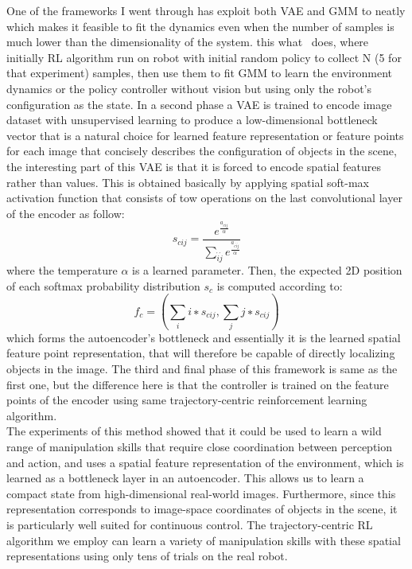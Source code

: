 One of the frameworks I went through has exploit both VAE and GMM to neatly which makes it feasible to fit the dynamics
even when the number of samples is much lower than the
dimensionality of the system. this what~\cite{finn2016deep} does, where initially RL algorithm run on robot with initial random policy to collect N (5 for that experiment) samples, then use them to fit GMM to learn the environment dynamics  or the policy controller without vision but using only the robot’s configuration as the state. In a second phase a VAE is trained to encode image dataset with unsupervised learning to produce a low-dimensional bottleneck vector that is a natural choice for learned feature representation or feature points for each image that concisely describes the configuration of objects in the scene, the interesting part of this VAE is that it is forced to encode spatial features rather than values. This is obtained  basically by applying spatial soft-max activation function that consists of tow operations on the last convolutional layer of the encoder as follow:
\begin{equation}
s_{cij} = \frac {e^{\frac{a_{cij}}{\alpha}}}
{\sum_{\acute{i}\acute{j}} e^{ \frac {a_{c \acute{i} \acute{j}}}{\alpha}}}
\end{equation}
where the temperature $\alpha$ is a learned parameter. Then, the expected
2D position of each softmax probability distribution $s_c$ is
computed according to:
\begin{equation}
f_c = (\sum_i i ∗ s_{cij} , \sum_j j ∗ s_{cij} )
\end{equation}
which forms the autoencoder's bottleneck and essentially it is the learned spatial feature point representation, that will therefore be capable of directly localizing objects in the image. The third and final phase of this framework is same as the first one, but the difference here is that the controller is trained on the feature points of the encoder using same trajectory-centric reinforcement
learning algorithm.\\
The experiments of this method showed that it could be used to learn a wild range of manipulation skills that require close coordination between perception and
action, and uses a spatial feature representation of the environment, which is learned as a bottleneck layer in
an autoencoder. This allows us to learn a compact state from high-dimensional real-world images. Furthermore, since this
representation corresponds to image-space coordinates of objects in the scene, it is particularly well suited for continuous control. The trajectory-centric RL algorithm we employ can learn a variety of manipulation skills with these spatial
representations using only tens of trials on the real robot.\\

